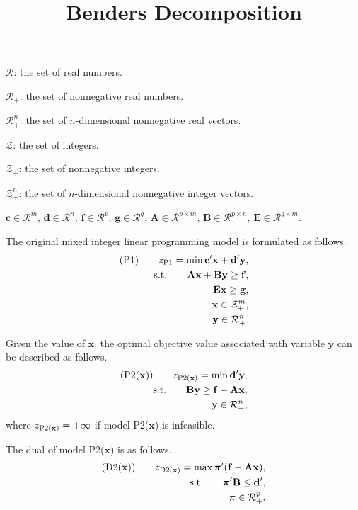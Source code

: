 \documentclass[UTF8]{article}
\title{\textbf{\Large Benders Decomposition}}
\author{}
\date{}
\newcommand{\vect}{\mathbf}
\newcommand{\set}{\mathcal}
\begin{document}
\maketitle

$\set{R}$: the set of real numbers.

$\set{R}_{+}$: the set of nonnegative real numbers.

$\set{R}_{+}^{n}$: the set of $n$-dimensional nonnegative real vectors.

$\set{Z}$: the set of integers.

$\set{Z}_{+}$: the set of nonnegative integers.

$\set{Z}_{+}^{n}$: the set of $n$-dimensional nonnegative integer vectors.

$\vect{c} \in \set{R}^{m}$, $\vect{d} \in \set{R}^{n}$, $\vect{f} \in \set{R}^{p}$, $\vect{g} \in \set{R}^{q}$, $\vect{A} \in \set{R}^{p \times m}$, $\vect{B} \in \set{R}^{p \times n}$, $\vect{E} \in \set{R}^{q \times m}$.

The original mixed integer linear programming model is formulated as follows.
\begin{align}
	(\text{\rm P1}) \qquad z_{\rm P1} = \min \vect{c}' \vect{x} + \vect{d}' \vect{y}, & \\
	\text{\rm s.t.} \qquad \vect{A} \vect{x} + \vect{B} \vect{y} \ge \vect{f}, & \\
	\vect{E} \vect{x} \ge \vect{g}, & \\
	\vect{x} \in \set{Z}_{+}^{m}, & \\
	\vect{y} \in \set{R}_{+}^{n}. &
\end{align}

Given the value of $\vect{x}$, the optimal objective value associated with variable $\vect{y}$ can be described as follows.
\begin{align}
	(\text{\rm P2}(\vect{x})) \qquad z_{{\rm P2}(\vect{x})} = \min \vect{d}' \vect{y}, & \\
	\text{\rm s.t.} \qquad \vect{B} \vect{y} \ge \vect{f} - \vect{A} \vect{x}, & \\
	\vect{y} \in \set{R}_{+}^{n}, &
\end{align}
where $z_{{\rm P2}(\vect{x})} = + \infty$ if model P2($\vect{x}$) is infeasible.

The dual of model P2($\vect{x}$) is as follows.
\begin{align}
	(\text{\rm D2}(\vect{x})) \qquad z_{{\rm D2}(\vect{x})} = \max \bm{\pi}' (\vect{f} - \vect{A} \vect{x}), & \\
	\text{\rm s.t.} \qquad \bm{\pi}' \vect{B} \le \vect{d}', & \\
	\bm{\pi} \in \set{R}_{+}^{p}. &
\end{align}
\end{document}
